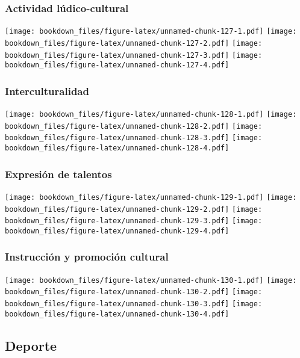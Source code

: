\documentclass[]{article}
\theoremstyle{definition}
\theoremstyle{definition}
\theoremstyle{definition}
\theoremstyle{remark}
\begin{document}
\subsubsection{Actividad
lúdico-cultural}\label{actividad-ludico-cultural}

\texttt{[image: bookdown\_files/figure-latex/unnamed-chunk-127-1.pdf]}
\texttt{[image: bookdown\_files/figure-latex/unnamed-chunk-127-2.pdf]}
\texttt{[image: bookdown\_files/figure-latex/unnamed-chunk-127-3.pdf]}
\texttt{[image: bookdown\_files/figure-latex/unnamed-chunk-127-4.pdf]}

\subsubsection{Interculturalidad}\label{interculturalidad}

\texttt{[image: bookdown\_files/figure-latex/unnamed-chunk-128-1.pdf]}
\texttt{[image: bookdown\_files/figure-latex/unnamed-chunk-128-2.pdf]}
\texttt{[image: bookdown\_files/figure-latex/unnamed-chunk-128-3.pdf]}
\texttt{[image: bookdown\_files/figure-latex/unnamed-chunk-128-4.pdf]}

\subsubsection{Expresión de talentos}\label{expresion-de-talentos}

\texttt{[image: bookdown\_files/figure-latex/unnamed-chunk-129-1.pdf]}
\texttt{[image: bookdown\_files/figure-latex/unnamed-chunk-129-2.pdf]}
\texttt{[image: bookdown\_files/figure-latex/unnamed-chunk-129-3.pdf]}
\texttt{[image: bookdown\_files/figure-latex/unnamed-chunk-129-4.pdf]}

\subsubsection{Instrucción y promoción
cultural}\label{instruccion-y-promocion-cultural}

\texttt{[image: bookdown\_files/figure-latex/unnamed-chunk-130-1.pdf]}
\texttt{[image: bookdown\_files/figure-latex/unnamed-chunk-130-2.pdf]}
\texttt{[image: bookdown\_files/figure-latex/unnamed-chunk-130-3.pdf]}
\texttt{[image: bookdown\_files/figure-latex/unnamed-chunk-130-4.pdf]}

\subsection{Deporte}\label{deporte}
\end{document}
